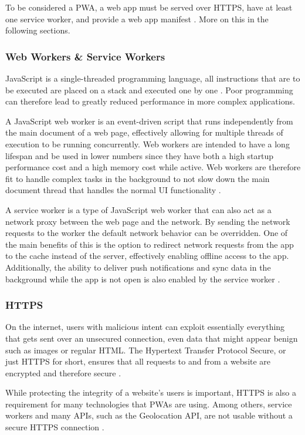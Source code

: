 \documentclass[a4paper,12pt]{article}
\begin{document}
To be considered a PWA, a web app must be served over HTTPS, have at least one service worker, and provide a web app manifest \cite{serviceworker_efficiency}. More on this in the following sections.

\subsubsection{Web Workers \& Service Workers}
\label{Theory_PWA_serviceWorkers}
JavaScript is a single-threaded programming language, all instructions that are to be executed are placed on a stack and executed one by one \cite{mozilla_js}. Poor programming can therefore lead to greatly reduced performance in more complex applications.

A JavaScript web worker is an event-driven script that runs independently from the main document of a web page, effectively allowing for multiple threads of execution to be running concurrently. Web workers are intended to have a long lifespan and be used in lower numbers since they have both a high startup performance cost and a high memory cost while active. Web workers are therefore fit to handle complex tasks in the background to not slow down the main document thread that handles the normal UI functionality \cite{workers_html_spec}.

A service worker is a type of JavaScript web worker that can also act as a network proxy between the web page and the network. By sending the network requests to the worker the default network behavior can be overridden. One of the main benefits of this is the option to redirect network requests from the app to the cache instead of the server, effectively enabling offline access to the app. Additionally, the ability to deliver push notifications and sync data in the background while the app is not open is also enabled by the service worker \cite{service_workers_spec}.

\subsubsection{HTTPS}
\label{Theory_PWA_HTTPS}
On the internet, users with malicious intent can exploit essentially everything that gets sent over an unsecured connection, even data that might appear benign such as images or regular HTML. The Hypertext Transfer Protocol Secure, or just HTTPS for short, ensures that all requests to and from a website are encrypted and therefore secure \cite{why_https_matters}.

While protecting the integrity of a website’s users is important, HTTPS is also a requirement for many technologies that PWAs are using. Among others, service workers and many APIs, such as the Geolocation API, are not usable without a secure HTTPS connection \cite{why_https_matters}.
\end{document}
